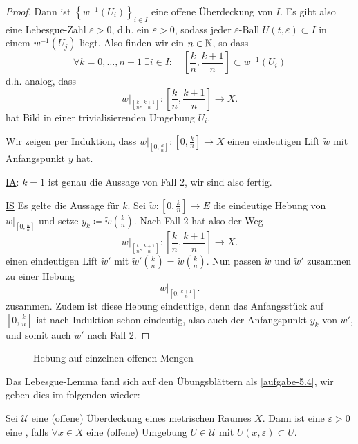 \begin{proof}
    Dann ist $\left \{w^{-1}(U_i)\right\}_{i \in I} $ eine offene Überdeckung von $I$. Es gibt also eine Lebesgue-Zahl  $ε>0$, d.h. ein  $ε>0$, sodass jeder  $ε$-Ball  $U(t,ε)\subset I$ in einem $w^{-1}(U_j)$ liegt. Also finden wir ein $n\in \mathbb{N}$, so dass 
    \[
      \forall k=0,\ldots,n-1 \; \exists i\in I \colon  \quad  \left[ \frac{k}{n}, \frac{k+1}{n} \right] \subset w^{-1}(U_i)
    \]
    d.h. analog, dass
    \[
    w|_{\left[ \frac{k}{n}, \frac{k+1}{n} \right] } \colon  \left[ \frac{k}{n}, \frac{k+1}{n} \right] \to  X
    .\] 
    hat Bild in einer trivialisierenden Umgebung $U_i$.

    Wir zeigen per Induktion, dass $w|_{\left[ 0,\frac{k}{n} \right] }\colon  \left[ 0, \frac{k}{n} \right]  \to  X$ einen eindeutigen Lift $\tilde{w}$ mit Anfangspunkt $y$ hat.

     \underline{IA}: $k=1$ ist genau die Aussage von Fall 2, wir sind also fertig. 

     \underline{IS} Es gelte die Aussage für $k$. Sei  $\tilde{w}\colon  \left[0,\frac{k}{n}\right]\to  E$ die eindeutige Hebung von $w|_{\left[0,\frac{k}{n}\right]}$ und setze $y_k \coloneqq  \tilde{w}\left( \frac{k}{n} \right) $. Nach Fall 2 hat also der Weg
     \[
     w|_{\left[ \frac{k}{n}, \frac{k+1}{n} \right] }\colon  \left[ \frac{k}{n}, \frac{k+1}{n} \right] \to  X
     .\] 
     einen eindeutigen Lift $\tilde{w}'$ mit $\tilde{w}'\left( \frac{k}{n} \right) = \tilde{w}\left(\frac{k}{n}\right)$. Nun passen $\tilde{w}$ und $\tilde{w}'$ zusammen zu einer Hebung 
     \[
     w|_{\left[ 0, \frac{k+1}{n} \right] }
     .\] 
     zusammen. Zudem ist diese Hebung eindeutige, denn das Anfangsstück auf $\left[0, \frac{k}{n}\right]$ ist nach Induktion schon eindeutig, also auch der Anfangspunkt  $y_k$ von  $\tilde{w}'$, und somit auch $\tilde{w}'$ nach Fall 2.
\end{proof}

\begin{figure}[ht]
    \centering
    \caption{Hebung auf einzelnen offenen Mengen}
    \label{fig:hebung-auf-einzelnen-offenen-mengen}
\end{figure}

\begin{remark*}
    Das Lebesgue-Lemma fand sich auf den Übungsblättern als \autoref{aufgabe-5.4}, wir geben dies im folgenden wieder:
\end{remark*}

\begin{definition*}[Lebesguezahl]\label{def:lebesguezahl}
    Sei $\mathcal{U}$ eine (offene) Überdeckung eines metrischen Raumes $X$. Dann ist eine  $ε>0$ eine  , falls $\forall x\in X$ eine (offene) Umgebung $U\in \mathcal{U}$ mit $U(x,ε) \subset U$.
\end{definition*}

